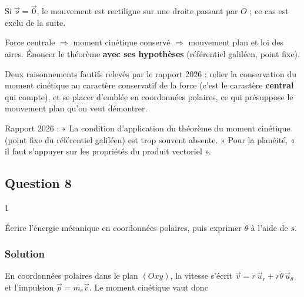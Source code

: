 \documentclass[11pt,a4paper]{article}
\begin{document}
Si \(\vec s=\vec0\), le mouvement est rectiligne sur une droite passant par \(O\) ; ce cas est exclu de la suite.

\begin{methode}

Force centrale \(\Rightarrow\) moment cinétique conservé \(\Rightarrow\) mouvement plan et loi des aires. Énoncer le théorème \textbf{avec ses hypothèses} (référentiel galiléen, point fixe).

\end{methode}

\begin{piege}

Deux raisonnements fautifs relevés par le rapport 2026 : relier la conservation du moment cinétique au caractère conservatif de la force (c'est le caractère \textbf{central} qui compte), et se placer d'emblée en coordonnées polaires, ce qui présuppose le mouvement plan qu'on veut démontrer.

\end{piege}

\begin{jury}

Rapport 2026 : « La condition d'application du théorème du moment cinétique (point fixe du référentiel galiléen) est trop souvent absente. » Pour la planéité, « il faut s'appuyer sur les propriétés du produit vectoriel ».

\end{jury}

\hypertarget{question-8}{%
\subsection{Question 8}\label{question-8}}

\begin{indication}{1}

Écrire l'énergie mécanique en coordonnées polaires, puis exprimer \(\dot\theta\) à l'aide de \(s\).

\end{indication}

\hypertarget{solution-7}{%
\subsubsection{Solution}\label{solution-7}}

En coordonnées polaires dans le plan \((Oxy)\), la vitesse s'écrit \(\vec v=\dot r\,\vec u_r+r\dot\theta\,\vec u_\theta\) et l'impulsion \(\vec p=m_e\vec v\). Le moment cinétique vaut donc
\end{document}
